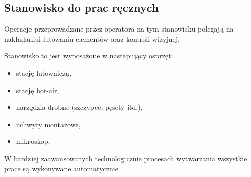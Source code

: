 \subsection{Stanowisko do prac ręcznych}
Operacje przeprowadzane przez operatora na tym stanowisku polegają na nakładaniu\linebreak i lutowaniu elementów oraz kontroli wizyjnej.

\breakparagraph{}
Stanowisko to jest wyposażone w następujący osprzęt:
\begin{itemize}
	\item stację lutowniczą,
	\item stację hot-air,
	\item narzędzia drobne (szczypce, pęsety itd.),
	\item uchwyty montażowe,
	\item mikroskop.
\end{itemize}

W bardziej zaawansowanych technologicznie procesach wytwarzania wszystkie prace są wykonywane automatycznie.